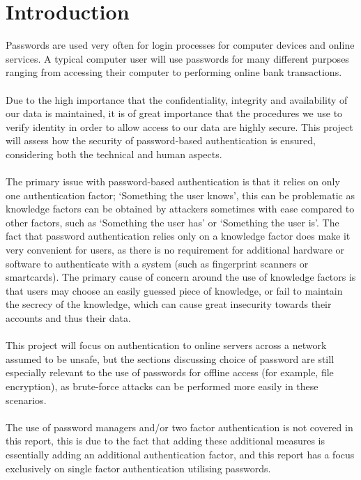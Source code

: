 \documentclass[11pt]{article}
\begin{document}
\section{Introduction} \label{INTRO}
Passwords are used very often for login processes for computer devices and online services. A typical computer user will use passwords for many different purposes ranging from accessing their computer to performing online bank transactions.\\\\
Due to the high importance that the confidentiality, integrity and availability of our data is maintained, it is of great importance that the procedures we use to verify identity in order to allow access to our data are highly secure.
This project will assess how the security of password-based authentication is ensured, considering both the technical and human aspects.\\\\
The primary issue with password-based authentication is that it relies on only one authentication factor; `Something the user knows', this can be problematic as knowledge factors can be obtained by attackers sometimes with ease compared to other factors, such as `Something the user has' or `Something the user is'.
The fact that password authentication relies only on a knowledge factor does make it very convenient for users, as there is no requirement for additional hardware or software to authenticate with a system (such as fingerprint scanners or smartcards).
The primary cause of concern around the use of knowledge factors is that users may choose an easily guessed piece of knowledge, or fail to maintain the secrecy of the knowledge, which can cause great insecurity towards their accounts and thus their data.\\\\
This project will focus on authentication to online servers across a network assumed to be unsafe, but the sections discussing choice of password are still especially relevant to the use of passwords for offline access (for example, file encryption), as brute-force attacks can be performed more easily in these scenarios.\\\\
The use of password managers and/or two factor authentication is not covered in this report, this is due to the fact that adding these additional measures is essentially adding an additional authentication factor, and this report has a focus exclusively on single factor authentication utilising passwords.
\end{document}
